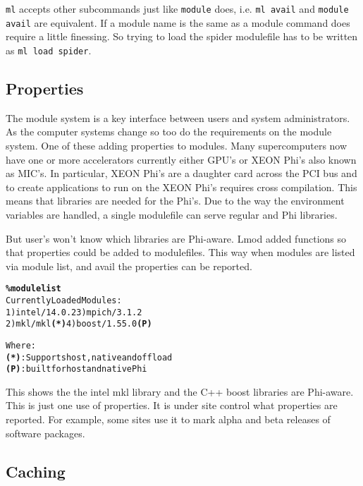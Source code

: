 \texttt{ml} accepts other subcommands just like \texttt{module} does,
i.e. \texttt{ml avail} and \texttt{module avail} are equivalent.  If a
module name is the same as a module command does require a little
finessing.  So trying to load the spider modulefile has to be written
as \texttt{ml load spider}. 


\subsection{Properties}

The module system is a key interface between users and system
administrators.
As the computer systems change so too do the requirements on the module
system.  One of these adding properties to modules.  Many
supercomputers now have one or more accelerators currently either GPU's
or XEON Phi's also known as MIC's.   In particular, XEON Phi's are a
daughter card across the PCI bus and to create applications to run on
the XEON Phi's requires cross compilation.  This means that libraries
are needed for the Phi's.  Due to the way the environment variables
are handled, a single modulefile can serve regular and Phi libraries.

But user's won't know which libraries are Phi-aware.  Lmod added
functions so that properties could be added to modulefiles.  This way
when modules are listed via module list, and avail the properties can
be reported.  
{\small
\begin{alltt}
  \textbf{\% module list}    
  Currently Loaded Modules:
    1) intel/14.0.2       3) mpich/3.1.2   
    2) mkl/mkl      \textbf{(*)}   4) boost/1.55.0 \textbf{(P)}

  Where:
   \textbf{(*)}:  Supports host, native and offload
   \textbf{(P)}:  built for host and native Phi
\end{alltt}
}
\noindent
This shows the the intel mkl library and the C++ boost libraries are Phi-aware.
This is just one use of properties.  It is under site
control what properties are reported.  For example, some sites use it
to mark alpha and beta releases of software packages.

\subsection{Caching}

